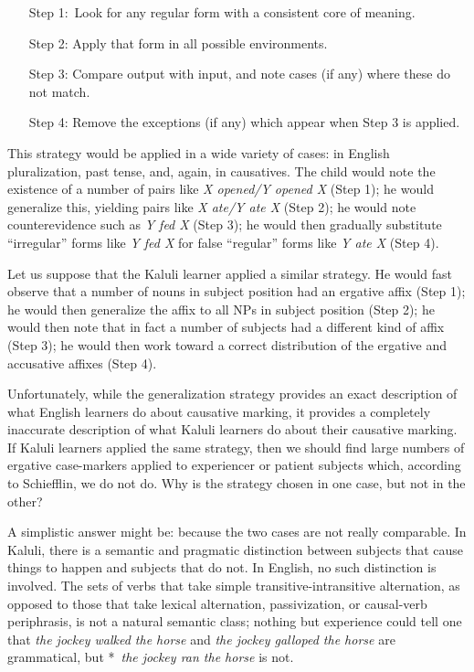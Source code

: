 \begin{enumerate}[labelindent=0pt, leftmargin=!, labelwidth=\widthof{Step 4:}]
\item[Step 1:\,]Look for any regular form with a consistent core of meaning.
\item[Step 2:]Apply that form in all possible environments.
\item[Step 3:]Compare output with input, and note cases (if any) where these do not match.
\item[Step 4:]Remove the exceptions (if any) which appear when Step 3 is applied.
\end{enumerate}

This strategy would be applied in a wide variety of cases: in English pluralization, past tense, and, again, in causatives. The child would note the existence of a number of pairs like \textit{X opened/Y opened X} (Step 1); he would generalize this, yielding pairs like \textit{X ate/Y ate X} (Step 2); he would note counterevidence such as \textit{Y fed X} (Step 3); he would then gradually substitute ``irregular'' forms like \textit{Y fed X} for false ``regular'' forms like \textit{Y ate X} (Step 4).

Let us suppose that the Kaluli learner applied a similar strategy. He would fast observe that a number of nouns in subject position had an ergative affix (Step 1); he would then generalize the affix to all NPs in subject position (Step 2); he would then note that in fact a number of subjects had a different kind of affix (Step 3); he would then work toward a correct distribution of the ergative and accusative affixes (Step 4).

Unfortunately, while the generalization strategy provides an exact description of what English learners do about causative marking, it provides a completely inaccurate description of what Kaluli learners do about their causative marking. If Kaluli learners applied the same strategy, then we should find large numbers of ergative case-markers applied to experiencer or patient subjects which, according to Schiefflin, we do not do. Why is the  strategy chosen in one case, but not in the other? 

A simplistic answer might be: because the two cases are not really comparable. In Kaluli, there is a semantic and pragmatic distinction between subjects that cause things to happen and subjects that do not. In English, no such distinction is involved. The sets of verbs that take simple transitive-intransitive alternation, as opposed to those that take lexical alternation, passivization, or causal-verb periphrasis, is not a natural semantic class; nothing but experience could tell one that \textit{the jockey walked the horse} and \textit{the jockey galloped the horse} are grammatical, but *~\textit{the jockey ran the horse} is not.


